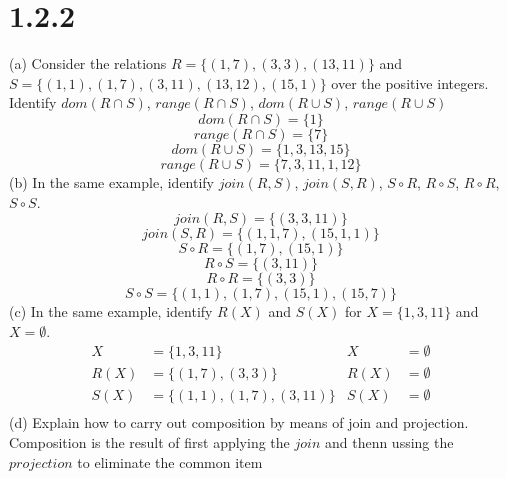 \documentclass{article}
\begin{document}
\section*{1.2.2}
(a) Consider the relations $R=\{ (1,7), (3,3), (13,11) \}$ and $S=\{ (1,1), (1,7), (3,11), (13,12), (15,1) \}$ over the positive integers. Identify $dom(R\cap S)$, $range(R\cap S)$, $dom(R\cup S)$, $range(R\cup S)$
\begin{equation*}
    dom(R\cap S) = \{ 1\}
\end{equation*}
\begin{equation*}
    range(R\cap S) = \{ 7\}
\end{equation*}
\begin{equation*}
    dom(R\cup S) = \{ 1, 3, 13, 15 \}
\end{equation*}
\begin{equation*}
    range(R\cup S) = \{ 7, 3, 11, 1, 12 \}
\end{equation*}
(b) In the same example, identify $join(R,S)$, $join(S,R)$, $S \circ R$, $R\circ S$, $R \circ R$, $S \circ S$.
\begin{equation*}
    join(R,S) = \{ (3,3,11) \}
\end{equation*}
\begin{equation*}
    join(S,R) = \{ (1, 1, 7), (15, 1, 1) \}
\end{equation*}
\begin{equation*}
    S \circ R = \{ (1,7), (15, 1) \}
\end{equation*}
\begin{equation*}
    R \circ S = \{ (3, 11) \}
\end{equation*}
\begin{equation*}
    R \circ R = \{ (3, 3) \}
\end{equation*}
\begin{equation*}
    S \circ S = \{ (1, 1), (1, 7), (15, 1), (15, 7) \}
\end{equation*}
(c) In the same example, identify $R(X)$ and $S(X)$ for $X=\{ 1, 3, 11 \}$ and $X=\emptyset$.
\begin{align*}
    X&=\{ 1, 3, 11 \} & X&=\emptyset\\
    R(X)&=\{(1,7), (3,3)\} & R(X) &=\emptyset\\
    S(X)&=\{ (1,1), (1,7), (3,11)\} & S(X) &=\emptyset\\
\end{align*}
(d) Explain how to carry out composition by means of join and projection.\\
Composition is the result of first applying the $join$ and thenn ussing the $projection$ to eliminate the common item
\end{document}
